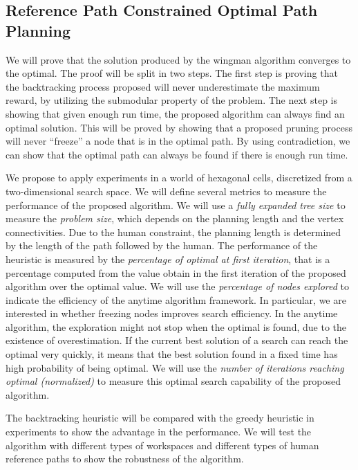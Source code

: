 \documentclass[phd]{byuprop}
\begin{document}
\subsection{Reference Path Constrained Optimal Path Planning}
\label{sec:validation:reference_path_constrained_optimal_path_planning}

We will prove that the solution produced by the wingman algorithm converges to the optimal.
The proof will be split in two steps.
The first step is proving that the backtracking process proposed will never underestimate the maximum reward, by utilizing the submodular property of the problem.
The next step is showing that given enough run time, the proposed algorithm can always find an optimal solution.
This will be proved by showing that a proposed pruning process will never ``freeze'' a node that is in the optimal path.
By using contradiction, we can show that the optimal path can always be found if there is enough run time.

We propose to apply experiments in a world of hexagonal cells,  discretized from a two-dimensional search space.
We will define several metrics to measure the performance of the proposed algorithm.
We will use a \emph{fully expanded tree size} to measure the \emph{problem size}, which depends on the planning length and the vertex connectivities.
Due to the human constraint, the planning length is determined by the length of the path followed by the human.
The performance of the heuristic is measured by the \emph{percentage of optimal at first iteration}, that is a percentage computed from the value obtain in the first iteration of the proposed algorithm over the optimal value.
We will use the \emph{percentage of nodes explored} to indicate the efficiency of the anytime algorithm framework.
In particular, we are interested in whether freezing nodes improves search efficiency.
In the anytime algorithm, the exploration might not stop when the optimal is found, due to the existence of overestimation.
If the current best solution of a search can reach the optimal very quickly, it means that the best solution found in a fixed time has high probability of being optimal.
We will use the \emph{number of iterations reaching optimal (normalized)} to measure this optimal search capability of the proposed algorithm.

The backtracking heuristic will be compared with the greedy heuristic in experiments to show the advantage in the performance.
We will test the algorithm with different types of workspaces and different types of human reference paths to show the robustness of the algorithm.
\end{document}
